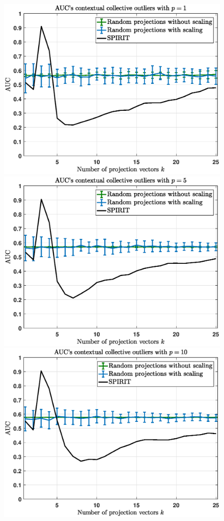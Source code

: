 \begin{figure}[h]
	\centering
	\includegraphics[scale=0.36]{analysis/AUCs_collective}
	\includegraphics[scale=0.36]{analysis/AUCs_collective1}
	\includegraphics[scale=0.36]{analysis/AUCs_collective2}

\end{figure}
